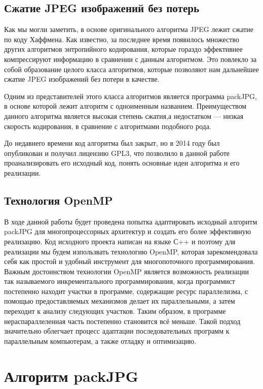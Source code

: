 \documentclass{matmex-diploma-custom}
\begin{document}

\subsection{Сжатие JPEG изображений без потерь}
Как мы могли заметить, в основе оригинального алгоритма JPEG лежит сжатие по коду Хаффмена. Как известно, за последнее время появилось множество других алгоритмов энтропийного кодирования, которые гораздо эффективнее компрессируют информацию в сравнении с данным алгоритмом. Это повлекло за собой образование целого класса алгоритмов, которые позволяют нам дальнейшее сжатие JPEG изображений без  потери в качестве.

    Одним из представителей этого класса алгоритмов является программа packJPG, в основе которой лежит алгоритм с одноименным названием. Преимуществом данного алгоритма является высокая степень сжатия,а недостатком  --- низкая скорость кодирования, в сравнение с алгоритмами подобного рода.

    До недавнего времени код алгоритма был закрыт, но в 2014 году был опубликован и получил лицензию GPL3, что позволило в данной работе проанализировать его исходный код, понять основные идеи алгоритма и его реализации.


\subsection{Технология OpenMP}
В ходе данной работы будет проведена попытка адаптировать исходный алгоритм packJPG для многопроцессорных архитектур и создать его более эффективную реализацию. Код исходного проекта написан на языке С++ и поэтому для реализации мы будем изпользвать технологию OpenMP, которая зарекомендовала себя как простой и удобный инструмент для многопоточного программирования.
    Важным достоинством технологии OpenMP является возможность реализации так называемого инкрементального программирования, когда программист постепенно находит участки в программе, содержащие ресурс параллелизма, с помощью предоставляемых механизмов делает их параллельными, а затем переходит к анализу следующих участков. Таким образом, в программе нераспараллеленная часть постепенно становится всё меньше. Такой подход значительно облегчает процесс адаптации последовательных программ к параллельным компьютерам, а также отладку и оптимизацию.

\section{Алгоритм packJPG}
\end{document}
